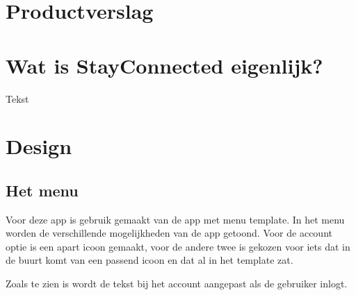 \documentclass[dutch]{report}
\begin{document}
	\newpage
	
	\section{Productverslag}
	
	\section{Wat is StayConnected eigenlijk?}
	Tekst
	
	\newpage
	
	\section{Design}
	
	
	\subsection{Het menu}
	Voor deze app is gebruik gemaakt van de app met menu template. In het menu worden de verschillende 
	mogelijkheden van de app getoond. Voor de account optie is een apart icoon gemaakt, voor de andere
	twee is gekozen voor iets dat in de buurt komt van een passend icoon en dat al in het template zat. 
	
	Zoals te zien is wordt de tekst bij het account aangepast als de gebruiker inlogt. 
	
\end{document}
